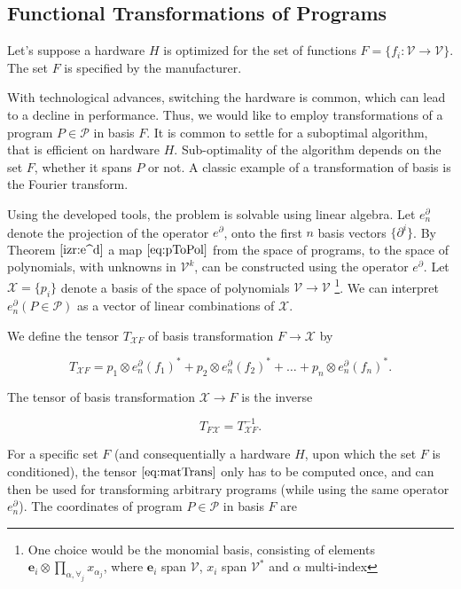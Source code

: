 \documentclass[11pt]{article}
\newcommand{\VV}{\mathcal{V}}
\newcommand{\e}{\mathbf{e}}
\newcommand{\X}{\mathcal{X}}
\newcommand{\dP}{\mathcal{P}}
\newcommand{\D}{\partial}
\begin{document}
   \subsection{Functional Transformations of Programs}\label{sec:FTP}
   
   Let's suppose a hardware $H$ is optimized for the set of functions
   $F=\{f_i:\VV\to \VV\}$. The set $F$ is specified by the manufacturer.  
   
   With technological advances, switching the hardware is common, which can lead
   to a decline in performance.  Thus, we would like to employ transformations
   of a program $P\in\dP$ in basis $F$. It is common to settle for a suboptimal
   algorithm, that is efficient on hardware $H$. Sub-optimality of the algorithm
   depends on the set $F$, whether it spans $P$ or not. A classic example of a
   transformation of basis is the Fourier transform.
   
   Using the developed tools, the problem is solvable using linear algebra. Let
   $e^\D_n$ denote the projection of the operator $e^\D$, onto the first $n$
   basis vectors $\{\D^i\}$. By Theorem $\ref{izr:e^d}$ a map
   $\eqref{eq:pToPol}$ from the space of programs, to the space of polynomials,
   with unknowns in $\VV^k$, can be constructed using the operator $e^\D$.
   Let $\X=\{p_i\}$ denote a basis of
   the space of polynomials $\VV\to \VV$ \footnote{One choice would be the monomial basis,
   consisting of elements $\e_i\otimes\prod\limits_{\alpha,\forall_j}
   x_{\alpha_j}$, where $\e_i$ span $\VV$, $x_i$ span $\VV^*$ and $\alpha$
   multi-index}. We can interpret $e^\D_n(P\in\dP)$ as a vector of linear
 combinations of $\X$. 
  
  We define the tensor $T_{\X F}$ of basis transformation $F\to\X$ by
  
  \begin{equation}\label{eq:matTransF}
  T_{\X F}=
  p_1\otimes e_n^\D(f_1)^* + p_2\otimes e_n^\D(f_2)^* + \ldots + p_n\otimes e_n^\D(f_n)^*.
  \end{equation}
  
  The tensor of basis transformation $\X\to F$ is the inverse
  
  \begin{equation}\label{eq:matTrans}
  T_{F\X}=T_{\X F}^{-1}.
  \end{equation}
  
  For a specific set $F$ (and consequentially a hardware $H$, upon which the set $F$ is conditioned), the tensor $\eqref{eq:matTrans}$ only has to be computed once, and can then be used for transforming arbitrary programs (while using the same operator $e^\D_n$).
  The coordinates of program $P\in\dP$ in basis $F$ are
  
\end{document}
